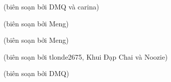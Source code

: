 \noindent

{}
\setcounter{equation}{0}


\begin{center}
\end{center}

\begin{flushright}
    (biên soạn bởi DMQ và carina)
\end{flushright}
\newpage

{\vspace{1.5mm}}
\setcounter{equation}{0}


\newpage
\begin{center}
\end{center}

\begin{flushright}
    (biên soạn bởi Meng)
\end{flushright}
\newpage

{}
\setcounter{equation}{0}


\begin{center}
\end{center}


\begin{flushright}
   (biên soạn bởi Meng)
\end{flushright}
\newpage

{}
\setcounter{equation}{0}


\newpage
\begin{center}
\end{center}

\begin{flushright}
    (biên soạn bởi tlonde2675, Khui Đạp Chai và Noozie)
\end{flushright}
\newpage

{}
\setcounter{equation}{0}


\newpage
\begin{center}
\end{center}

\begin{flushright}
    (biên soạn bởi DMQ)
\end{flushright}



